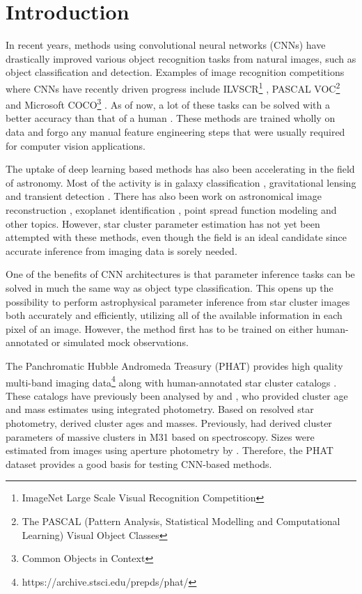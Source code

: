 \documentclass{aa}
\begin{document}
\section{Introduction}
In recent years, methods using convolutional neural networks (CNNs) have drastically improved various object recognition tasks from natural images, such as object classification and detection. Examples of image recognition competitions where CNNs have recently driven progress include ILVSCR\footnote{ImageNet Large Scale Visual Recognition Competition} \citep{ILSVRC15}, PASCAL VOC\footnote{The PASCAL (Pattern Analysis, Statistical Modelling and Computational Learning) Visual Object Classes} \citep{faster-rcnn} and Microsoft COCO\footnote{Common Objects in Context} \citep{2014arXiv1405.0312L}. As of now, a lot of these tasks can be solved with a better accuracy than that of a human \citep{ILSVRC15}. These methods are trained wholly on data and forgo any manual feature engineering steps that were usually required for computer vision applications.

The uptake of deep learning based methods has also been accelerating in the field of astronomy. Most of the activity is in galaxy classification \citep{dieleman, 2018ApJ...858..114H, 2018MNRAS.476.3661D}, gravitational lensing \citep{2017arXiv170207675P,2018MNRAS.473.3895L,2018ApJ...856...68P} and transient detection \citep{deephits, 2018MNRAS.473.3895L, 2017arXiv171001422S}. There has also been work on astronomical image reconstruction \citep{2016arXiv161204526F}, exoplanet identification \citep{2018AJ....155...94S}, point spread function modeling \citep{2018arXiv180107615H} and other topics. However, star cluster parameter estimation has not yet been attempted with these methods, even though the field is an ideal candidate since accurate inference from imaging data is sorely needed.

One of the benefits of CNN architectures is that parameter inference tasks can be solved in much the same way as object type classification. This opens up the possibility to perform astrophysical parameter inference from star cluster images both accurately and efficiently, utilizing all of the available information in each pixel of an image. However, the method first has to be trained on either human-annotated or simulated mock observations.

The Panchromatic Hubble Andromeda Treasury (PHAT) \citep{2012ApJS..200...18D} provides high quality multi-band imaging data\footnote{https://archive.stsci.edu/prepds/phat/} along with human-annotated star cluster catalogs \citep{2012ApJ...752...95J, 2015ApJ...802..127J}. These catalogs have previously been analysed by \cite{2014ApJ...786..117F} and \cite{2017A&A...602A.112D}, who provided cluster age and mass estimates using integrated photometry. Based on resolved star photometry, \cite{2017ApJ...839...78J} derived cluster ages and masses. Previously, \cite{2009AJ....137...94C} had derived cluster parameters of massive clusters in M31 based on spectroscopy. Sizes were estimated from images using aperture photometry by \cite{2015ApJ...802..127J}. Therefore, the PHAT dataset provides a good basis for testing CNN-based methods.
\end{document}
